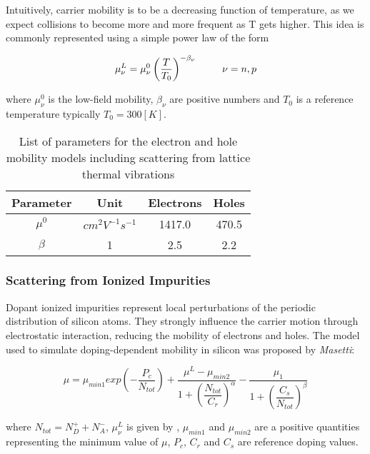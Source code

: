Intuitively, carrier mobility is to be a decreasing function of temperature, as we expect collisions to become more and more frequent as T gets higher. This idea is commonly represented using a simple power law of the form

\begin{equation}
\label{eq: mobility thermal}
\mu_\nu^L = \mu_\nu^0\left( \dfrac{T}{T_0}\right)^{-\beta_\nu} \psp{15} \nu = n,p
\end{equation}



where $\mu_\nu^0$ is the low-field mobility, $\beta_\nu$ are positive numbers and $T_0$ is a reference temperature typically $T_0=300[K]$.

\begin{table}[!h]
\centering
\begin{tabular}{cccc}
\toprule
Parameter & Unit & Electrons & Holes \\
\midrule
$\mu^0$ & $cm^2V^{-1}s^{-1}$ & 1417.0 & 470.5\\
$\beta$ & 1 & 2.5 & 2.2\\
\bottomrule
\end{tabular}
\caption{List of parameters for the electron and hole mobility models including scattering from lattice thermal vibrations}
\end{table}

\subsubsection{Scattering from Ionized Impurities}
Dopant ionized impurities represent local perturbations of the periodic distribution of silicon atoms. They strongly influence the carrier motion through electrostatic interaction, reducing the mobility of electrons and holes. The model used to simulate doping-dependent mobility in silicon was proposed by \textit{Masetti}:


\begin{equation}
\label{eq: mobility impurities}
\mu = \mu_{min1}exp\left( 	- \dfrac{P_c}{N_{tot}}\right)
 + \dfrac{\mu^L-\mu_{min2}}{1 + \left( \dfrac{N_{tot}}{C_r} \right)^{\alpha} } 
 - \dfrac{\mu_1}{1 + \left( \dfrac{C_s}{N_{tot}} \right)^{\beta} } 
\end{equation}

where $N_{tot} = N_D^+ + N_A^-$, $\mu_\nu^L$ is given by , $\mu_{min1}$ and $\mu_{min2}$  are a positive quantities representing the minimum value of $\mu$, $P_c$, $C_r$ and $C_s$ are reference doping values.


